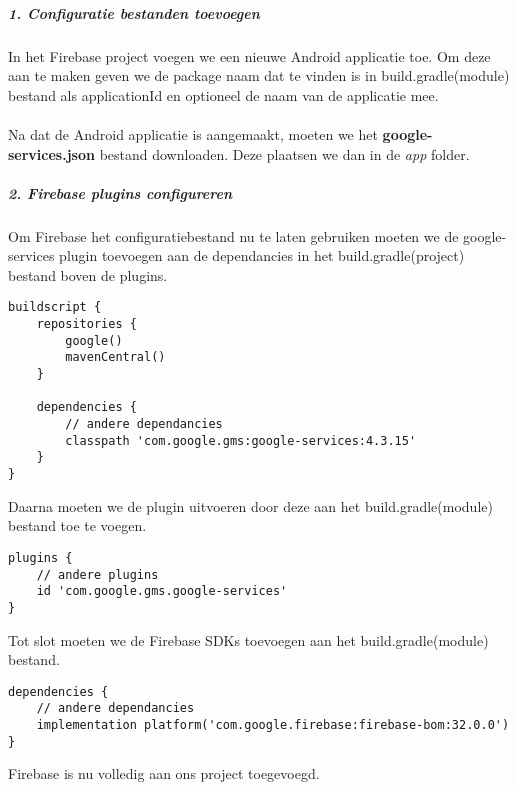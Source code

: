 \subparagraph{1. Configuratie bestanden toevoegen}
In het Firebase project voegen we een nieuwe Android applicatie toe. Om deze aan te maken geven we de package naam 
dat te vinden is in build.gradle(module) bestand als applicationId en optioneel de naam van de applicatie mee.
\\\\
Na dat de Android applicatie is aangemaakt, moeten we het \textbf{google-services.json} bestand downloaden. 
Deze plaatsen we dan in de \textit{app} folder.

\subparagraph{2. Firebase plugins configureren}
Om Firebase het configuratiebestand nu te laten gebruiken moeten we de google-services plugin toevoegen aan 
de dependancies in het build.gradle(project) bestand boven de plugins. 
\begin{verbatim}
buildscript {
    repositories {
        google()
        mavenCentral()
    }

    dependencies {
        // andere dependancies
        classpath 'com.google.gms:google-services:4.3.15'
    }
}
\end{verbatim}
Daarna moeten we de plugin uitvoeren door deze aan het build.gradle(module) bestand toe te voegen.
\begin{verbatim}
plugins {
    // andere plugins 
    id 'com.google.gms.google-services'
}
\end{verbatim}
Tot slot moeten we de Firebase SDKs toevoegen aan het build.gradle(module) bestand.
\begin{verbatim}
dependencies {
    // andere dependancies
    implementation platform('com.google.firebase:firebase-bom:32.0.0')
}
\end{verbatim}
Firebase is nu volledig aan ons project toegevoegd.